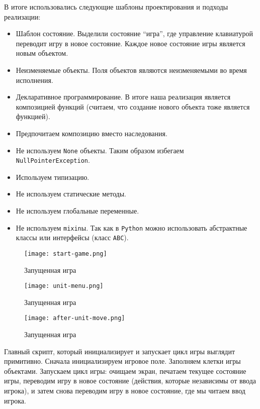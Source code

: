 В итоге использовались следующие шаблоны проектирования и подходы реализации:

\begin{itemize}
  \item Шаблон состояние. Выделили состояние ``игра'', где управление клавиатурой 
    переводит игру в новое состояние. Каждое новое состояние игры является новым объектом.
  \item Неизменяемые объекты. 
    Поля объектов являются неизменяемыми во время исполнения.
  \item Декларативное программирование. 
    В итоге наша реализация является композицией функций
    (считаем, что создание нового объекта тоже является функцией).
  \item Предпочитаем композицию вместо наследования.
  \item Не используем \verb|None| объекты. Таким образом избегаем \verb|NullPointerException|.
  \item Используем типизацию.
  \item Не используем статические методы.
  \item Не используем глобальные переменные.
  \item Не используем \verb|mixin|ы. Так как в \verb|Python| можно использовать абстрактные классы или интерфейсы (класс \verb|ABC|).
\end{itemize}

\begin{figure}[H]
	\begin{center}
		\texttt{[image: start-game.png]}
		\caption{Запущенная игра}
	\end{center}
\end{figure}

\begin{figure}[H]
	\begin{center}
		\texttt{[image: unit-menu.png]}
		\caption{Запущенная игра}
	\end{center}
\end{figure}

\begin{figure}[H]
	\begin{center}
		\texttt{[image: after-unit-move.png]}
		\caption{Запущенная игра}
	\end{center}
\end{figure}

Главный скрипт, который инициализирует и запускает цикл игры выглядит примитивно.
Сначала инициализируем игровое поле. Заполняем клетки игры объектами.
Запускаем цикл игры: очищаем экран, печатаем текущее состояние игры, 
переводим игру в новое состояние (действия, которые независимы от ввода игрока), 
и затем снова переводим игру в новое состояние, где мы читаем ввод игрока.

